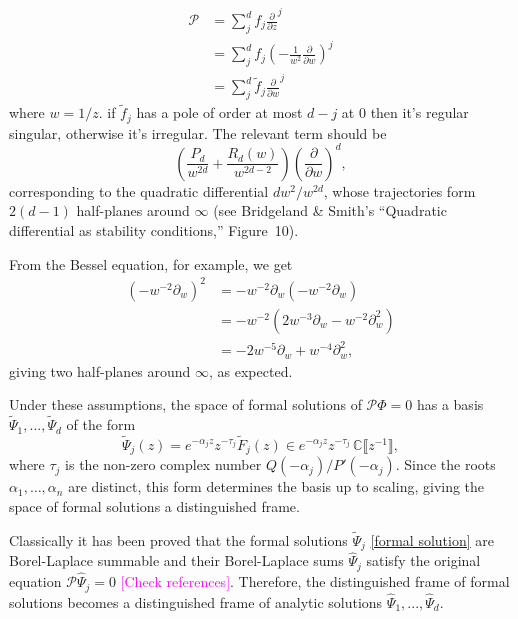 \documentclass{article}
\theoremstyle{definition}
\newcommand{\C}{\mathbb{C}}
\newcommand{\series}[1]{\tilde{#1}}
\begin{document}
\begin{align*}
\mathcal{P} & = \sum_j^d f_j \frac{\partial}{\partial z}^j \\
& = \sum_j^d f_j \left(-\frac{1}{w^2} \frac{\partial}{\partial w}\right)^j\\
&=  \sum_j^d \tilde{f}_j \frac{\partial}{\partial w}^j
\end{align*}
where $w=1/z$.  if $\tilde{f}_j $ has a pole of order at most $d-j$ at 0 then it's regular singular, otherwise it's irregular. The relevant term should be
\[ \left(\frac{P_d}{w^{2d}} + \frac{R_d(w)}{w^{2d-2}}\right) \left(\frac{\partial}{\partial w}\right)^d , \]
corresponding to the quadratic differential $dw^2/w^{2d}$, whose trajectories form $2(d-1)$ half-planes around $\infty$ (see Bridgeland \& Smith's ``Quadratic differential as stability conditions,'' Figure~10).

From the Bessel equation, for example, we get
\begin{align*}
(-w^{-2}\partial_w)^2&=-w^{-2}\partial_w(-w^{-2}\partial_w)\\
&=-w^{-2}(2w^{-3}\partial_w-w^{-2}\partial_w^2)\\
&=-2w^{-5}\partial_w+w^{-4}\partial_w^2,
\end{align*}
giving two half-planes around $\infty$, as expected.
\color{black}

Under these assumptions, the space of formal solutions of $\mathcal{P}\Phi = 0$ has a basis $\series{\Psi}_1,...,\series{\Psi}_d$ of the form~\cite{int-irreg}\cite[Proposition~2.2.7, p.~111]{EcalleIII}
\begin{equation}\label{formal solution}
\series{\Psi}_j(z)=e^{-\alpha_j z}z^{-\tau_j}\series{F}_j(z)\in e^{-\alpha_j z } z^{-\tau_j}\,\C \llbracket z^{-1} \rrbracket,
\end{equation}
where $\tau_j$ is the non-zero complex number $Q(-\alpha_j)/P'(-\alpha_j)$. Since the roots $\alpha_1, \ldots, \alpha_n$ are distinct, this form determines the basis up to scaling, giving the space of formal solutions a distinguished frame.

Classically it has been proved that the formal solutions $\series{\Psi}_j$ \eqref{formal solution} are Borel-Laplace summable and their Borel-Laplace sums $\hat{\Psi}_j$ satisfy the original equation $\mathcal{P}\hat{\Psi}_j=0$ \cite{Ramis?}\textcolor{magenta}{[Check references]}. Therefore, the distinguished frame of formal solutions becomes a distinguished frame of analytic solutions $\hat{\Psi}_1,...,\hat{\Psi}_d$.       
\end{document}
